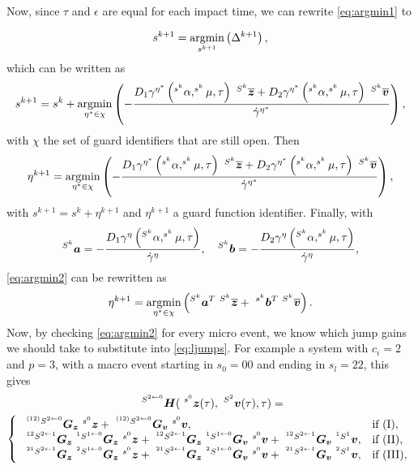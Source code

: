 \documentclass[../DC2017114Bouma.tex]{subfiles}
\begin{document}
Now, since $\tau$ and $\epsilon$ are equal for each impact time, we can rewrite \eqref{eq:argmin1} to

\begin{align}
s^{k+1} = \underset{s^{k+1}}{\operatorname{\text{argmin}}}\left(\Delta^{k+1}\right),
\end{align}
which can be written as
\begin{align}
s^{k+1} = s^k + \underset{\eta^*\in\chi}{\argmin}\left(-\frac{D_1\gamma^{\eta^*}\left(^{s^k}\alpha,^{s^k}\mu,\tau\right)\ ^{S^k}\overline{\zb} + D_2\gamma^{\eta^*}\left(^{s^k}\alpha,^{s^k}\mu,\tau\right)\ ^{S^k}\overline{\vb}}{\dot{\gamma}^{\eta^*}}\right),
\end{align}
with $\chi$ the set of guard identifiers that are still open. Then
\begin{align}
\eta^{k+1} = \underset{\eta^*\in\chi}{\argmin}\left(-\frac{D_1\gamma^{\eta^*}\left(^{s^k}\alpha,^{s^k}\mu,\tau\right)\ ^{S^k}\overline{\zb} + D_2\gamma^{\eta^*}\left(^{s^k}\alpha,^{s^k}\mu,\tau\right)\ ^{S^k}\overline{\vb}}{\dot{\gamma}^{\eta^*}}\right),\label{eq:argmin2}
\end{align}
with $s^{k+1} = s^k + \eta^{k+1}$ and $\eta^{k+1}$ a guard function identifier. Finally, with
\begin{align}
^{S^k}{\boldsymbol{a}} = -\frac{D_1\gamma^{\eta}\left(^{S^k}\alpha,^{s^k}\mu,\tau\right)}{\dot{\gamma}^{\eta}},
\quad
^{S^k}{\boldsymbol{b}} = -\frac{D_2\gamma^{\eta}\left(^{S^k}\alpha,^{s^k}\mu,\tau\right)}{\dot{\gamma}^{\eta}},
\end{align}
\eqref{eq:argmin2} can be rewritten as
\begin{align}
\eta^{k+1} = \underset{\eta^*\in\chi}{\argmin}\left(^{S^k}\ab^T\ ^{S^k}\overline{\zb} +\  ^{s^k}\bb^T\ ^{S^k}\overline{\vb}\right).
\end{align}
Now, by checking \eqref{eq:argmin2} for every micro event, we know which jump gains we should take to substitute into \eqref{eq:ljumps}.
For example a system with $c_i = 2$ and $p = 3$, with a macro event starting in $s_0 = 00$ and ending in $s_l = 22$, this gives 
\begin{multline}
\ ^{ S^{2\leftarrow 0}}\Hb(\ ^{s^0}\zb(\tau),\ ^{S^2}\vb(\tau),\tau) =\\ \left\lbrace\begin{array}{ll}
\ ^{^{(12)} S^{2\leftarrow 0}}\Gb_\zb\ ^{s^0}\zb + \ ^{^{(12)} S^{2\leftarrow 0}}\Gb_\vb\ ^{s^0}\vb, & \text{if }(\text{I}),\\
\ ^{^{12} S^{2\leftarrow 1}}\Gb_\zb\ ^{^{1} S^{1\leftarrow 0}}\Gb_\zb\ ^{s^0}\zb + \ ^{^{12} S^{2\leftarrow 1}}\Gb_\zb\ ^{^{1} S^{1\leftarrow 0}}\Gb_\vb\ ^{s^0}\vb + \ ^{^{12} S^{2\leftarrow 1}}\Gb_\vb\ ^{^1 S^1}\vb, & \text{if }(\text{II}),\\
\ ^{^{21} S^{2\leftarrow 1}}\Gb_\zb\ ^{^{2} S^{1\leftarrow 0}}\Gb_\zb\ ^{s^0}\zb + \ ^{^{21} S^{2\leftarrow 1}}\Gb_\zb\ ^{^{2} S^{1\leftarrow 0}}\Gb_\vb\ ^{s^0}\vb + \ ^{^{21} S^{2\leftarrow 1}}\Gb_\vb\ ^{^{2} S^1}\vb, & \text{if }(\text{III}),
\end{array}\right.\label{eq:H2200}
\end{multline}
\end{document}
